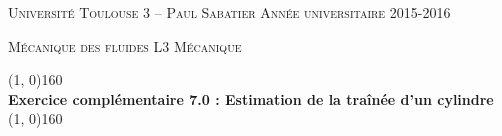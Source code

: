 \documentclass[10pt, a4paper]{article}
\renewcommand{\thickline}[2]{\linethickness{#1} \line(1, 0){#2}}
\begin{document}

\begin{center}

  \textsc{Université Toulouse 3 -- Paul Sabatier \hfill Année universitaire 2015-2016}
  
  \textsc{Mécanique des fluides \hfill L3 Mécanique}
  
  \vspace{0mm}
  
  \begin{center}
    \thickline{0.4mm}{160}
    \\ \vspace{3mm}
  \textbf{\large Exercice complémentaire 7.0 : Estimation de la traînée d'un cylindre}
    \\ %
    \thickline{0.4mm}{160}
  \end{center}

  
\end{center}


\medskip
\end{document}
